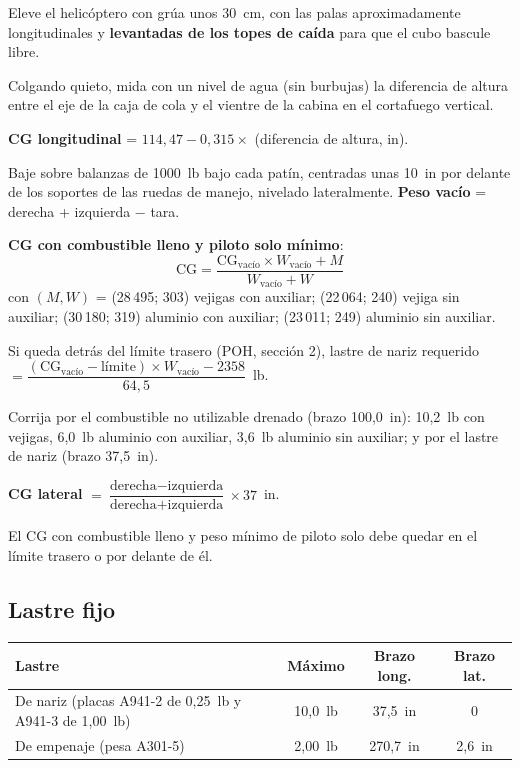 \begin{pasos}
\item Eleve el helicóptero con grúa unos 30~cm, con las palas aproximadamente longitudinales y \textbf{levantadas de los topes de caída} para que el cubo bascule libre.
\item Colgando quieto, mida con un nivel de agua (sin burbujas) la diferencia de altura entre el eje de la caja de cola y el vientre de la cabina en el cortafuego vertical.
\item \textbf{CG longitudinal} = $114{,}47 - 0{,}315 \times$ (diferencia de altura, in).
\item Baje sobre balanzas de 1000~lb bajo cada patín, centradas unas 10~in por delante de los soportes de las ruedas de manejo, nivelado lateralmente. \textbf{Peso vacío} = derecha + izquierda $-$ tara.
\item \textbf{CG con combustible lleno y piloto solo mínimo}:
 \[ \mathrm{CG} = \frac{\mathrm{CG}_{\text{vacío}} \times W_{\text{vacío}} + M}{W_{\text{vacío}} + W} \]
 con $(M, W)$ = (28\,495; 303) vejigas con auxiliar; (22\,064; 240) vejiga sin auxiliar; (30\,180; 319) aluminio con auxiliar; (23\,011; 249) aluminio sin auxiliar.
\item Si queda detrás del límite trasero (POH, sección 2), lastre de nariz requerido $= \dfrac{(\mathrm{CG}_{\text{vacío}} - \text{límite}) \times W_{\text{vacío}} - 2358}{64{,}5}$~lb.
\item Corrija por el combustible no utilizable drenado (brazo 100,0~in): 10,2~lb con vejigas, 6,0~lb aluminio con auxiliar, 3,6~lb aluminio sin auxiliar; y por el lastre de nariz (brazo 37,5~in).
\item \textbf{CG lateral} $= \dfrac{\text{derecha} - \text{izquierda}}{\text{derecha} + \text{izquierda}} \times 37$~in.
\end{pasos}

\begin{precaucion}
El CG con combustible lleno y peso mínimo de piloto solo debe quedar en el límite trasero o por delante de él.
\end{precaucion}

\subsection{Lastre fijo}

\begin{center}
\begin{tabularx}{\linewidth}{@{}>{\raggedright\arraybackslash}Xccc@{}}
\toprule
Lastre & Máximo & Brazo long. & Brazo lat. \\
\midrule
De nariz (placas A941-2 de 0,25~lb y A941-3 de 1,00~lb) & 10,0~lb & 37,5~in & 0 \\
De empenaje (pesa A301-5) & 2,00~lb & 270,7~in & 2,6~in \\
\bottomrule
\end{tabularx}
\end{center}

